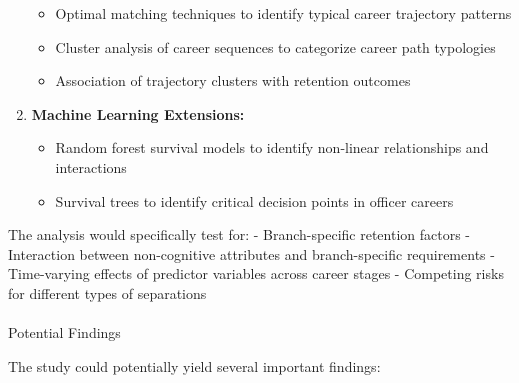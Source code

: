 \documentclass[./main.tex]{subfiles}
\makeatletter
\let\oldparagraph\paragraph
\renewcommand{\paragraph}{
    \@ifstar
      \xxxParagraphStar
      \xxxParagraphNoStar
  }
\newcommand{\xxxParagraphStar}[1]{\oldparagraph*{#1}\mbox{}}
\newcommand{\xxxParagraphNoStar}[1]{\oldparagraph{#1}\mbox{}}
\providecommand{\tightlist}{%
  \setlength{\itemsep}{0pt}\setlength{\parskip}{0pt}}
\makeatother
\begin{document}
\begin{enumerate}
  \begin{itemize}
  \tightlist
  \item
    Optimal matching techniques to identify typical career trajectory
    patterns
  \item
    Cluster analysis of career sequences to categorize career path
    typologies
  \item
    Association of trajectory clusters with retention outcomes
  \end{itemize}
\item
  \textbf{Machine Learning Extensions:}

  \begin{itemize}
  \tightlist
  \item
    Random forest survival models to identify non-linear relationships
    and interactions
  \item
    Survival trees to identify critical decision points in officer
    careers
  \end{itemize}
\end{enumerate}

The analysis would specifically test for: - Branch-specific retention
factors - Interaction between non-cognitive attributes and
branch-specific requirements - Time-varying effects of predictor
variables across career stages - Competing risks for different types of
separations

\paragraph{Potential Findings}\label{potential-findings}

The study could potentially yield several important findings:
\end{document}
